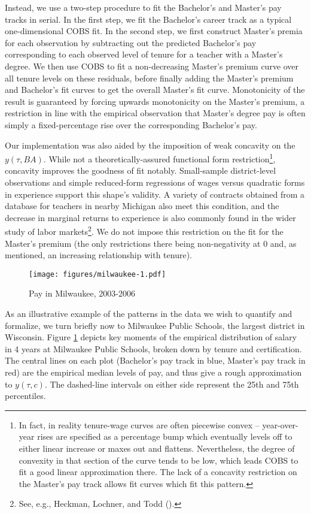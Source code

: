 Instead, we use a two-step procedure to fit the Bachelor's and Master's
pay tracks in serial. In the first step, we fit the Bachelor's career
track as a typical one-dimensional COBS fit. In the second step, we
first construct Master's premia for each observation by subtracting out
the predicted Bachelor's pay corresponding to each observed level of
tenure for a teacher with a Master's degree. We then use COBS to fit a
non-decreasing Master's premium curve over all tenure levels on these
residuals, before finally adding the Master's premium and Bachelor's fit
curves to get the overall Master's fit curve. Monotonicity of the result
is guaranteed by forcing upwards monotonicity on the Master's premium, a
restriction in line with the empirical observation that Master's degree
pay is often simply a fixed-percentage rise over the corresponding
Bachelor's pay.

Our implementation was also aided by the imposition of weak concavity on
the \(y(\tau, BA)\). While not a theoretically-assured functional form
restriction\footnote{In fact, in reality tenure-wage curves are often
  piecewise convex -- year-over-year rises are specified as a percentage
  bump which eventually levels off to either linear increase or maxes
  out and flattens. Nevertheless, the degree of convexity in that
  section of the curve tends to be low, which leads COBS to fit a good
  linear approximation there. The lack of a concavity restriction on the
  Master's pay track allows fit curves which fit this pattern.},
concavity improves the goodness of fit notably. Small-sample
district-level observations and simple reduced-form regressions of wages
versus quadratic forms in experience support this shape's validity. A
variety of contracts obtained from a database for teachers in nearby
Michigan also meet this condition, and the decrease in marginal returns
to experience is also commonly found in the wider study of labor
markets\footnote{See, e.g., Heckman, Lochner, and Todd
  (\citeyear{heckman}).}. We do not impose this
restriction on the fit for the Master's premium (the only restrictions
there being non-negativity at 0 and, as mentioned, an increasing
relationship with tenure).

\begin{figure}[htbp]
\centering
\texttt{[image: figures/milwaukee-1.pdf]}
\caption{\label{fig:mwk}Pay in Milwaukee, 2003-2006}
\end{figure}

As an illustrative example of the patterns in the data we wish to
quantify and formalize, we turn briefly now to Milwaukee Public Schools,
the largest district in Wisconsin. Figure \ref{fig:mwk} depicts key
moments of the empirical distribution of salary in 4 years at Milwaukee
Public Schools, broken down by tenure and certification. The central
lines on each plot (Bachelor's pay track in blue, Master's pay track in
red) are the empirical median levels of pay, and thus give a rough
approximation to \(y(\tau, c)\). The dashed-line intervals on either
side represent the 25th and 75th percentiles.

